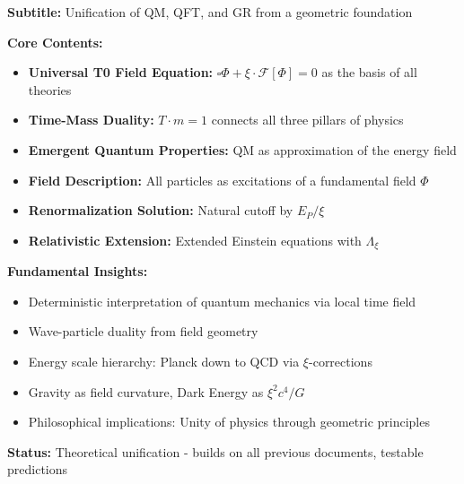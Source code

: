 	\begin{documentbox}
		\textbf{Subtitle:} Unification of QM, QFT, and GR from a geometric foundation
		
		\textbf{Core Contents:}
		\begin{itemize}
			\item \textbf{Universal T0 Field Equation:} $\square \Phi + \xi \cdot \mathcal{F}[\Phi] = 0$ as the basis of all theories
			\item \textbf{Time-Mass Duality:} $T \cdot m = 1$ connects all three pillars of physics
			\item \textbf{Emergent Quantum Properties:} QM as approximation of the energy field
			\item \textbf{Field Description:} All particles as excitations of a fundamental field $\Phi$
			\item \textbf{Renormalization Solution:} Natural cutoff by $E_P/\xi$
			\item \textbf{Relativistic Extension:} Extended Einstein equations with $\Lambda_{\xi}$
		\end{itemize}
		
		\textbf{Fundamental Insights:}
		\begin{itemize}
			\item Deterministic interpretation of quantum mechanics via local time field
			\item Wave-particle duality from field geometry
			\item Energy scale hierarchy: Planck down to QCD via $\xi$-corrections
			\item Gravity as field curvature, Dark Energy as $\xi^2 c^4 / G$
			\item Philosophical implications: Unity of physics through geometric principles
		\end{itemize}
		
		\textbf{Status:} Theoretical unification - builds on all previous documents, testable predictions
	\end{documentbox}
